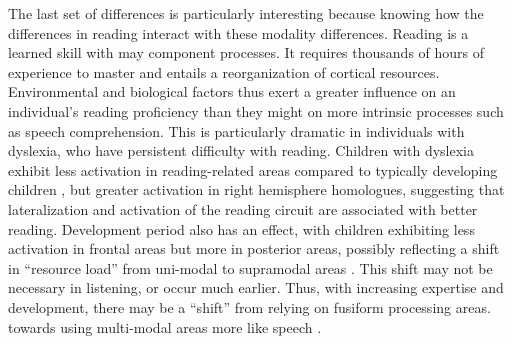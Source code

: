 The last set of differences is particularly interesting because knowing how the differences in reading interact with these modality differences. Reading is a learned skill with may component processes. It requires thousands of hours of experience to master and entails a reorganization of cortical resources. Environmental and biological factors thus exert a greater influence on an individual’s reading proficiency than they might on more intrinsic processes such as speech comprehension. This is particularly dramatic in individuals with dyslexia, who have persistent difficulty with reading. Children with dyslexia exhibit less activation in reading-related areas compared to typically developing children \citep{Pugh2000}, but greater activation in right hemisphere homologues, suggesting that lateralization and activation of the reading circuit are associated with better reading. Development period also has an effect, with children exhibiting less activation in frontal areas but more in posterior areas, possibly reflecting a shift in “resource load” from uni-modal to supramodal areas \citep{Berl2011}. This shift may not be necessary in listening, or occur much earlier. Thus, with increasing expertise and development, there may be a “shift” from relying on fusiform processing areas. towards using multi-modal areas more like speech \citep{Monzalvo2013}. 




